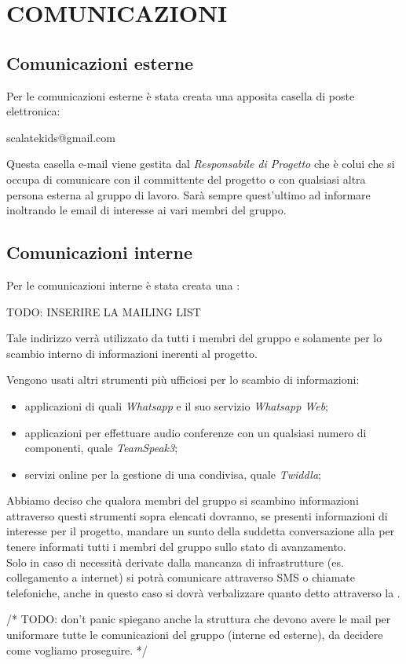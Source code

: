\section{COMUNICAZIONI}
\subsection{Comunicazioni esterne}
Per le comunicazioni esterne è stata creata una apposita casella di poste elettronica: 
\begin{center}
scalatekids@gmail.com 	
\end{center}
Questa casella e-mail viene gestita dal \textit{Responsabile di Progetto} che è colui che si occupa di comunicare con il committente del progetto o con qualsiasi altra persona esterna al gruppo di lavoro. Sarà sempre quest'ultimo ad informare inoltrando le email di interesse ai vari membri del gruppo.

\subsection{Comunicazioni interne}
Per le comunicazioni interne è stata creata una :
\begin{center}
TODO: INSERIRE LA MAILING LIST 
\end{center}
Tale indirizzo verrà utilizzato da tutti i membri del gruppo e solamente per lo scambio interno di informazioni inerenti al progetto.

Vengono usati altri strumenti più ufficiosi per lo scambio di informazioni:
\begin{itemize}
\item applicazioni di  quali \textit{Whatsapp} e il suo servizio \textit{Whatsapp Web};
\item applicazioni  per effettuare audio conferenze con un qualsiasi numero di componenti, quale \textit{TeamSpeak3};
\item servizi online per la gestione di una  condivisa, quale \textit{Twiddla};
\end{itemize}

Abbiamo deciso che qualora membri del gruppo si scambino informazioni attraverso questi strumenti sopra elencati dovranno, se presenti informazioni di interesse per il progetto, mandare un sunto della suddetta conversazione alla  per tenere informati tutti i membri del gruppo sullo stato di avanzamento.\\
Solo in caso di necessità derivate dalla mancanza di infrastrutture (es. collegamento a internet) si potrà comunicare attraverso SMS o chiamate telefoniche, anche in questo caso si dovrà verbalizzare quanto detto attraverso la .

/*
	TODO: don't panic spiegano anche la struttura che devono avere le mail per uniformare tutte le comunicazioni del gruppo (interne ed esterne), da decidere come vogliamo proseguire.
*/
